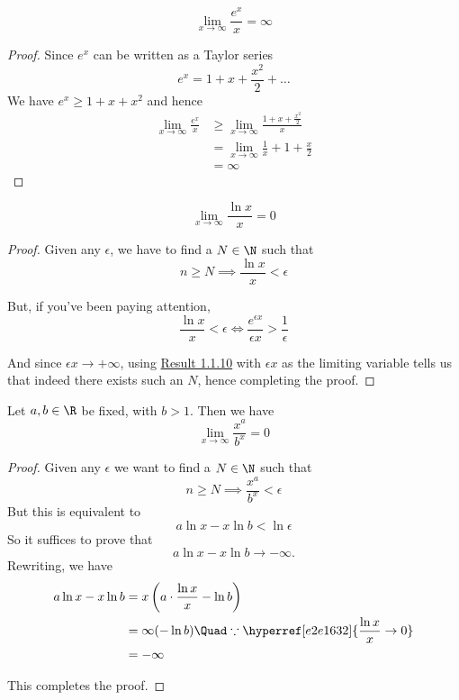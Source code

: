\label{b905ee7}
$$
	\lim_{x\to\infty}\frac{e^x}x=\infty
$$

\begin{proof}
	Since $e^x$ can be written as a Taylor series
	$$
		e^x=1 + x + \frac{x^2}2 +\ldots
	$$
	We have $e^x\geq 1 + x + x^2$ and hence
	\begin{align*}
		\lim_{x\to\infty}\frac{e^x}x
		 & \geq\lim_{x\to\infty}\frac{1+x+\frac{x^2}2}x \\
		 & =\lim_{x\to\infty}\frac1x + 1 + \frac{x}2    \\
		 & = \infty
	\end{align*}
\end{proof}


\label{e2e1632}
$$
	\lim_{x\to\infty}\frac{\ln x}x = 0
$$

\begin{proof}
	Given any $\epsilon$, we have to find a $N\in\N$ such that
	$$
		n\geq N\implies\frac{\ln x}x<\epsilon
	$$

	But, if you've been paying attention,
	$$
		\frac{\ln x}x<\epsilon\iff\frac{e^{\epsilon x}}{\epsilon x}>\frac1\epsilon
	$$

	And since $\epsilon x\to+\infty$, using \hyperref[b905ee7]{Result
		1.1.10} with $\epsilon x$ as the limiting variable tells us that
	indeed there exists such an $N$, hence completing the proof.
\end{proof}

\label{f3540b0}

Let $a,b\in\R$ be fixed, with $b>1$. Then we have
$$
	\lim_{x\to\infty}\frac{x^a}{b^x}=0
$$

\begin{proof}
	Given any $\epsilon$ we want to find a $N\in\N$ such that
	$$
		n\geq N\implies\frac{x^a}{b^x}<\epsilon
	$$
	But this is equivalent to
	$$
		a\ln x-x\ln b<\ln\epsilon
	$$
	So it suffices to prove that
	$$
		a\ln x-x\ln b\to-\infty.
	$$
	Rewriting, we have
	\begin{align*}
		a\ln x-x\ln b
		 & = x\left(a\cdot\frac{\ln x}{x}-\ln b\right) \\
     & = \infty(-\ln b) \Quad\because\hyperref[e2e1632]{\frac{\ln x}{x}\to0} \\
     & = -\infty
	\end{align*}

  This completes the proof.
\end{proof}

